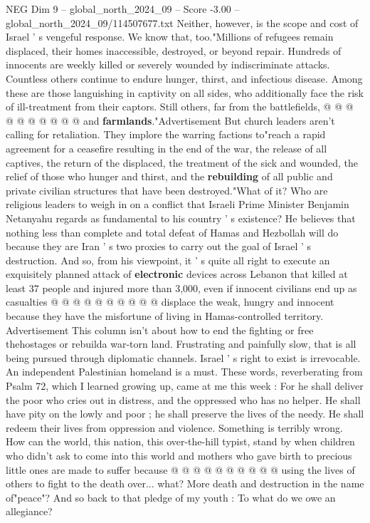 \begin{textsample}{NEG Dim 9 – global\_north\_2024\_09 – Score -3.00 – global\_north\_2024\_09/114507677.txt}
Neither, however, is the scope and cost of Israel ' s vengeful response.
We know that, too."Millions of refugees remain displaced, their homes inaccessible, destroyed, or beyond repair.
Hundreds of innocents are weekly killed or severely wounded by indiscriminate attacks.
Countless others continue to endure hunger, thirst, and infectious disease.
Among these are those languishing in captivity on all sides, who additionally face the risk of ill-treatment from their captors.
Still others, far from the battlefields, @ @ @ @ @ @ @ @ @ @ and \textbf{farmlands}."Advertisement But church leaders aren't calling for retaliation.
They implore the warring factions to"reach a rapid agreement for a ceasefire resulting in the end of the war, the release of all captives, the return of the displaced, the treatment of the sick and wounded, the relief of those who hunger and thirst, and the \textbf{rebuilding} of all public and private civilian structures that have been destroyed."What of it?
Who are religious leaders to weigh in on a conflict that Israeli Prime Minister Benjamin Netanyahu regards as fundamental to his country ' s existence?
He believes that nothing less than complete and total defeat of Hamas and Hezbollah will do because they are Iran ' s two proxies to carry out the goal of Israel ' s destruction.
And so, from his viewpoint, it ' s quite all right to execute an exquisitely planned attack of \textbf{electronic} devices across Lebanon that killed at least 37 people and injured more than 3,000, even if innocent civilians end up as casualties @ @ @ @ @ @ @ @ @ @ displace the weak, hungry and innocent because they have the misfortune of living in Hamas-controlled territory.
Advertisement This column isn't about how to end the fighting or free thehostages or rebuilda war-torn land.
Frustrating and painfully slow, that is all being pursued through diplomatic channels.
Israel ' s right to exist is irrevocable.
An independent Palestinian homeland is a must.
These words, reverberating from Psalm 72, which I learned growing up, came at me this week : For he shall deliver the poor who cries out in distress, and the oppressed who has no helper.
He shall have pity on the lowly and poor ; he shall preserve the lives of the needy.
He shall redeem their lives from oppression and violence.
Something is terribly wrong.
How can the world, this nation, this over-the-hill typist, stand by when children who didn't ask to come into this world and mothers who gave birth to precious little ones are made to suffer because @ @ @ @ @ @ @ @ @ @ using the lives of others to fight to the death over... what?
More death and destruction in the name of"peace"?
And so back to that pledge of my youth : To what do we owe an allegiance?

\end{textsample}
